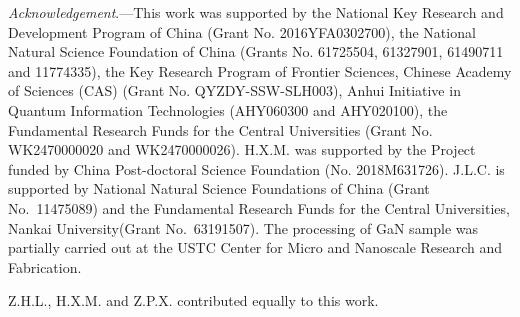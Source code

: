 \documentclass[prl,letterpaper,english,reprint,nofootinbib,aps,superscriptaddress,showpacs,showkeys]{revtex4-1}
\theoremstyle{definition}
\theoremstyle{remark}
\begin{document}
 \textit{Acknowledgement}.---This work was supported by the National Key Research and Development Program of China (Grant No. 2016YFA0302700), the National Natural Science Foundation of China (Grants No. 61725504, 61327901, 61490711 and 11774335), the Key Research Program of Frontier Sciences, Chinese Academy of Sciences (CAS) (Grant No. QYZDY-SSW-SLH003), Anhui Initiative in Quantum Information Technologies (AHY060300 and AHY020100), the Fundamental Research Funds for the Central Universities (Grant No. WK2470000020 and WK2470000026). H.X.M. was supported by the Project funded by China Post-doctoral Science Foundation (No. 2018M631726). J.L.C. is supported by National Natural Science Foundations of China (Grant No.\ 11475089) and the Fundamental Research Funds for the Central Universities, Nankai University(Grant No.\ 63191507). The processing of GaN sample was partially carried out at the USTC Center for Micro and Nanoscale Research and Fabrication.

 Z.H.L., H.X.M. and Z.P.X. contributed equally to this work.
\end{document}
